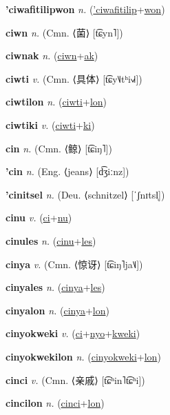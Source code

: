 \textbf{\hypertarget{'ciwafitilipwon}{'ciwafitilipwon}} \textit{n.} (\hyperlink{'ciwafitilip}{'ciwafitilip}+\allowbreak \hyperlink{won}{won})


\textbf{\hypertarget{ciwn}{ciwn}} \textit{n.} (Cmn. ⟨{\chinese{}菌}⟩ [t͡ɕyn˥])


\textbf{\hypertarget{ciwnak}{ciwnak}} \textit{n.} (\hyperlink{ciwn}{ciwn}+\allowbreak \hyperlink{ak}{ak})


\textbf{\hypertarget{ciwti}{ciwti}} \textit{v.} (Cmn. ⟨{\chinese{}具体}⟩ [t͡ɕy˥˩tʰi˧˩˧])


\textbf{\hypertarget{ciwtilon}{ciwtilon}} \textit{n.} (\hyperlink{ciwti}{ciwti}+\allowbreak \hyperlink{lon}{lon})


\textbf{\hypertarget{ciwtiki}{ciwtiki}} \textit{v.} (\hyperlink{ciwti}{ciwti}+\allowbreak \hyperlink{ki}{ki})


\textbf{\hypertarget{cin}{cin}} \textit{n.} (Cmn. ⟨{\chinese{}鲸}⟩ [t͡ɕiŋ˥])


\textbf{\hypertarget{'cin}{'cin}} \textit{n.} (Eng. ⟨jeans⟩ [d͡ʒiːnz])


\textbf{\hypertarget{'cinitsel}{'cinitsel}} \textit{n.} (Deu. ⟨schnitzel⟩ [ˈʃnɪtsl̩])


\textbf{\hypertarget{cinu}{cinu}} \textit{v.} (\hyperlink{ci}{ci}+\allowbreak \hyperlink{nu}{nu})


\textbf{\hypertarget{cinules}{cinules}} \textit{n.} (\hyperlink{cinu}{cinu}+\allowbreak \hyperlink{les}{les})


\textbf{\hypertarget{cinya}{cinya}} \textit{v.} (Cmn. ⟨{\chinese{}惊讶}⟩ [t͡ɕiŋ˥ja˥˩])


\textbf{\hypertarget{cinyales}{cinyales}} \textit{n.} (\hyperlink{cinya}{cinya}+\allowbreak \hyperlink{les}{les})


\textbf{\hypertarget{cinyalon}{cinyalon}} \textit{n.} (\hyperlink{cinya}{cinya}+\allowbreak \hyperlink{lon}{lon})


\textbf{\hypertarget{cinyokweki}{cinyokweki}} \textit{v.} (\hyperlink{ci}{ci}+\allowbreak \hyperlink{nyo}{nyo}+\allowbreak \hyperlink{kweki}{kweki})


\textbf{\hypertarget{cinyokwekilon}{cinyokwekilon}} \textit{n.} (\hyperlink{cinyokweki}{cinyokweki}+\allowbreak \hyperlink{lon}{lon})


\textbf{\hypertarget{cinci}{cinci}} \textit{v.} (Cmn. ⟨{\chinese{}亲戚}⟩ [t͡ɕʰin˥t͡ɕʰi])


\textbf{\hypertarget{cincilon}{cincilon}} \textit{n.} (\hyperlink{cinci}{cinci}+\allowbreak \hyperlink{lon}{lon})


